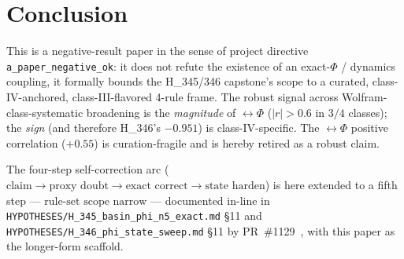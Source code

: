 \documentclass[11pt,a4paper]{article}
\newcommand{\bigphi}{\ensuremath{\Phi}}
\newcommand{\verdictref}[1]{\texttt{\detokenize{#1}}}
\begin{document}
\section{Conclusion}
\label{sec:conclusion}

This is a negative-result paper in the sense of project directive
\texttt{a\_paper\_negative\_ok}: it does not refute the existence of an
exact-$\bigphi$ / dynamics coupling, it formally bounds the H\_345/346
capstone's scope to a curated, class-IV-anchored, class-III-flavored
4-rule frame. The robust signal across Wolfram-class-systematic broadening
is the \emph{magnitude} of \verdictref{n_attr}$\leftrightarrow$\bigphi{}
($|r| > 0.6$ in $3/4$ classes); the \emph{sign} (and therefore H\_346's
$-0.951$) is class-IV-specific. The
\verdictref{max_basin}$\leftrightarrow$\bigphi{} positive correlation
($+0.55$) is curation-fragile and is hereby retired as a robust claim.

The four-step self-correction arc (\(\text{claim} \to \text{proxy doubt}
\to \text{exact correct} \to \text{state harden}\)) is here extended to a
fifth step --- \(\text{rule-set scope narrow}\) --- documented in-line in
\verb|HYPOTHESES/H_345_basin_phi_n5_exact.md| \S 11 and
\verb|HYPOTHESES/H_346_phi_state_sweep.md| \S 11 by
PR~\#1129~\citep{anima2026pr1129}, with this paper as the longer-form
scaffold.



\end{document}
